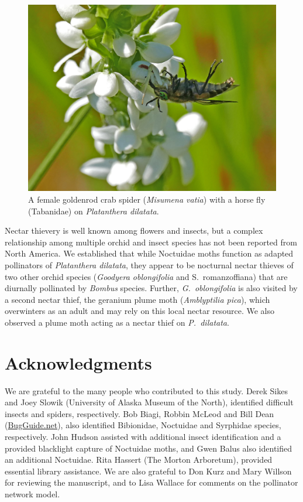 \begin{multicols}{2}
\begin{figure}[H]
\begin{center}
\vspace{2mm}
\includegraphics[width=\textwidth]{img/Misumena_vatia_Tabanidae.jpg}
\caption{A female goldenrod crab spider (\emph{Misumena vatia}) with a horse fly (Tabanidae) on \emph{Platanthera dilatata}.}
\label{Misumena_vatia_Tabanidae}
\end{center}
\end{figure}

Nectar thievery is well known among flowers and insects, but a complex
relationship among multiple orchid and insect species has not been
reported from North America. We established that while Noctuidae moths
function as adapted pollinators of \emph{Platanthera dilatata}, they
appear to be nocturnal nectar thieves of two other orchid species
(\emph{Goodyera oblongifolia} and S.\ romanzoffiana) that are diurnally
pollinated by \emph{Bombus} species. Further, \emph{G.\ oblongifolia} is
also visited by a second nectar thief, the geranium plume moth
(\emph{Amblyptilia pica}), which overwinters as an adult and may rely on
this local nectar resource. We also observed a plume moth acting as a
nectar thief on \emph{P.\ dilatata}.

\section{Acknowledgments}

We are grateful to the many people who contributed to this study. Derek
Sikes and Joey Slowik (University of Alaska Museum of the North),
identified difficult insects and spiders, respectively. Bob Biagi,
Robbin McLeod and Bill Dean (\href{https://bugguide.net/}{BugGuide.net}), also identified Bibionidae,
Noctuidae and Syrphidae species, respectively. John Hudson assisted
with additional insect identification and a provided blacklight capture
of Noctuidae moths, and Gwen Balus also identified an additional
Noctuidae. Rita Hassert (The Morton Arboretum), provided essential
library assistance. We are also grateful to Don Kurz and Mary Willson
for reviewing the manuscript, and to Lisa Wallace for comments on the
pollinator network model.


\end{multicols}
